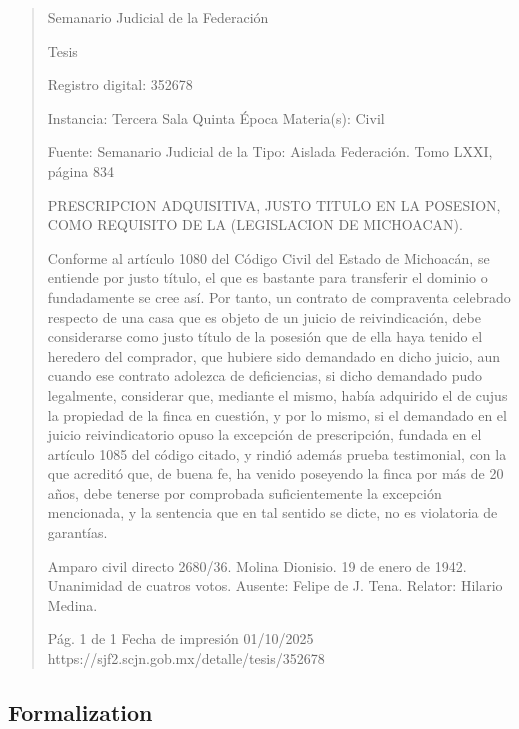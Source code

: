 \documentclass[11pt,a4paper]{article}
\begin{document}
\begin{quote}
                                                   Semanario Judicial de la Federación

                                                  Tesis

 Registro digital: 352678

 Instancia: Tercera Sala          Quinta Época                         Materia(s): Civil

                                  Fuente: Semanario Judicial de la     Tipo: Aislada
                                  Federación.
                                  Tomo LXXI, página 834


PRESCRIPCION ADQUISITIVA, JUSTO TITULO EN LA POSESION, COMO REQUISITO DE LA
(LEGISLACION DE MICHOACAN).


Conforme al artículo 1080 del Código Civil del Estado de Michoacán, se entiende por justo título, el
que es bastante para transferir el dominio o fundadamente se cree así. Por tanto, un contrato de
compraventa celebrado respecto de una casa que es objeto de un juicio de reivindicación, debe
considerarse como justo título de la posesión que de ella haya tenido el heredero del comprador,
que hubiere sido demandado en dicho juicio, aun cuando ese contrato adolezca de deficiencias, si
dicho demandado pudo legalmente, considerar que, mediante el mismo, había adquirido el de cujus
la propiedad de la finca en cuestión, y por lo mismo, si el demandado en el juicio reivindicatorio
opuso la excepción de prescripción, fundada en el artículo 1085 del código citado, y rindió además
prueba testimonial, con la que acreditó que, de buena fe, ha venido poseyendo la finca por más de
20 años, debe tenerse por comprobada suficientemente la excepción mencionada, y la sentencia
que en tal sentido se dicte, no es violatoria de garantías.


Amparo civil directo 2680/36. Molina Dionisio. 19 de enero de 1942. Unanimidad de cuatros votos.
Ausente: Felipe de J. Tena. Relator: Hilario Medina.




                                             Pág. 1 de 1             Fecha de impresión 01/10/2025
  https://sjf2.scjn.gob.mx/detalle/tesis/352678

\end{quote}

\subsection{Formalization}
\end{document}
